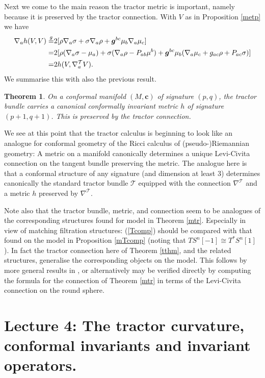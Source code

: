 \documentclass[a4paper,12pt]{amsart}
\newcommand{\cc}{\boldsymbol{c}}
\newcommand{\cT}{{\mathcal T}}
\def\bg{\mbox{\boldmath $g$}}
\newtheorem{theorem}{Theorem}[section]
\theoremstyle{remark}
\newcommand{\nn}[1]{(\ref{#1})}
\begin{document}
Next we come to the main reason the tractor metric is important,
namely because it is preserved by the tractor connection. With $V$ as in
Proposition \ref{metp} we have
\begin{equation}\nonumber
\begin{split}
\nabla_a h(V,V)\overset{g}{=}& 
2[\rho\nabla_a\sigma+\sigma\nabla_a\rho+\bg^{bc}\mu_b\nabla_a\mu_c]\\
=&2[\rho(\nabla_a\sigma-\mu_a)+\sigma(\nabla_a\rho-P_{ab}\mu^b)+
\bg^{bc}\mu_b(\nabla_a\mu_c+g_{ac}\rho+P_{ac}\sigma)]\\
=&2h(V,\nabla_a^{\mathcal{T}}V).
\end{split}
\end{equation}
We summarise this with also the previous result.
\begin{theorem}\label{mpara}
On a conformal manifold $(M,\cc)$ of signature $(p,q)$, the tractor
bundle carries a canonical conformally invariant metric $h$ of
signature $(p+1,q+1)$. This is preserved by the tractor connection.
\end{theorem}

We see at this point that the tractor calculus is beginning to look
like an analogue for conformal geometry of the Ricci calculus of
(pseudo-)Riemannian geometry: A metric on a manifold canonically
determines a unique Levi-Civita connection on the tangent bundle
preserving the metric. The analogue here is that a conformal structure
of any signature (and dimension at least 3) determines canonically the
standard tractor bundle $\cT$ equipped with the connection
$\nabla^\cT$ and a metric $h$ preserved by $\nabla^\cT$.


Note also that the tractor bundle, metric, and connection seem to be
analogues of the corresponding structures found for model in Theorem
\ref{mtr}. Especially in view of matching filtration structures:
\nn{Tcomp} should be compared with that found on the model in
Proposition \ref{mTcomp} (noting that $TS^n[-1]\cong T^*S^n[1]$). In
fact the tractor connection here of Theorem \ref{tthm}, and the
related structures, generalise the corresponding objects on the
model. This follows by more general results in \cite{CapGoamb}, or
alternatively may be verified directly by computing the formula for
the connection of Theorem \ref{mtr} in terms of the Levi-Civita
connection on the round sphere.








\section{Lecture 4: The tractor curvature, conformal invariants and invariant operators.} 
\end{document}
